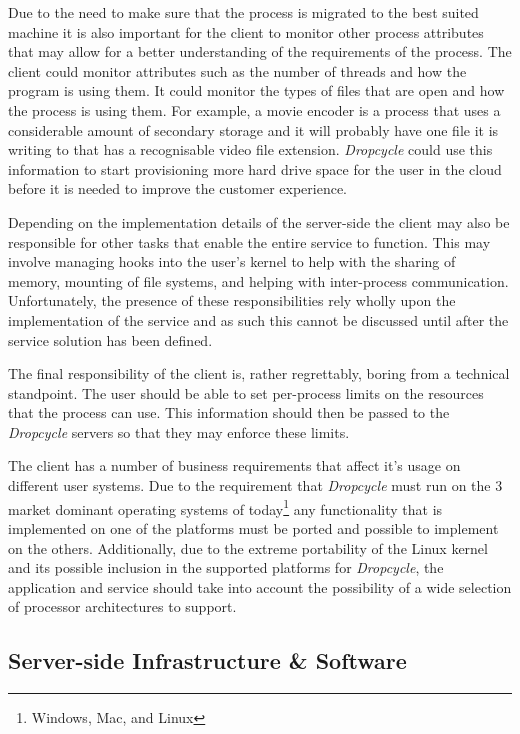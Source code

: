\documentclass[12pt, a4paper]{article}
\begin{document}
Due to the need to make sure that the process is migrated to the best suited
machine it is also important for the client to monitor other process attributes
that may allow for a better understanding of the requirements of the process.
The client could monitor attributes such as the number of threads and how the
program is using them. It could monitor the types of files that are open and how
the process is using them. For example, a movie encoder is a process that uses
a considerable amount of secondary storage and it will probably have one file
it is writing to that has a recognisable video file extension. \emph{Dropcycle}
could use this information to start provisioning more hard drive space for the
user in the cloud before it is needed to improve the customer experience.

Depending on the implementation details of the server-side the client may also
be responsible for other tasks that enable the entire service to function. This
may involve managing hooks into the user's kernel to help with the sharing of
memory, mounting of file systems, and helping with inter-process communication.
Unfortunately, the presence of these responsibilities rely wholly upon the
implementation of the service and as such this cannot be discussed until after
the service solution has been defined.

The final responsibility of the client is, rather regrettably, boring from a
technical standpoint. The user should be able to set per-process limits on the
resources that the process can use. This information should then be passed to
the \emph{Dropcycle} servers so that they may enforce these limits.

The client has a number of business requirements that affect it's usage on
different user systems. Due to the requirement that \emph{Dropcycle} must run
on the 3 market dominant operating systems of today\footnote{Windows, Mac, and
Linux} any functionality that is implemented on one of the platforms must be
ported and possible to implement on the others. Additionally, due to the extreme
portability of the Linux kernel and its possible inclusion in the supported
platforms for \emph{Dropcycle}, the application and service should take into
account the possibility of a wide selection of processor architectures to
support.

\subsection{Server-side Infrastructure \& Software}
\end{document}
